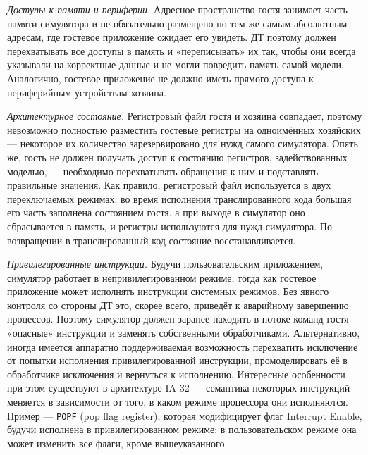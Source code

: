 \begin{itemize*}

\item \textit{Доступы к памяти и периферии.} Адресное пространство гостя занимает часть памяти симулятора и не обязательно размещено по тем же самым абсолютным адресам, где гостевое приложение ожидает его увидеть. ДТ поэтому должен перехватывать все доступы в память и «переписывать» их так, чтобы они всегда указывали на корректные данные и не могли повредить память самой модели. Аналогично, гостевое приложение не должно иметь прямого доступа к периферийным устройствам хозяина.

\item \textit{Архитектурное состояние.} Регистровый файл гостя и хозяина совпадает, поэтому невозможно полностью разместить гостевые регистры на одноимённых хозяйских --- некоторое их количество зарезервировано для нужд самого симулятора. Опять же, гость не должен получать доступ к состоянию регистров, задействованных моделью, --- необходимо перехватывать обращения к ним и подставлять правильные значения. Как правило, регистровый файл используется в двух переключаемых режимах: во время исполнения транслированного кода большая его часть заполнена состоянием гостя, а при выходе в симулятор оно сбрасывается в память, и регистры используются для нужд симулятора. По возвращении в транслированный код состояние восстанавливается. 

\item\textit{Привилегированные инструкции.} Будучи пользовательским приложением, симулятор работает в непривилегированном режиме, тогда как гостевое приложение может исполнять инструкции системных режимов. Без явного контроля со стороны ДТ это, скорее всего, приведёт к аварийному завершению процессов. Поэтому симулятор должен заранее находить в потоке команд гостя «опасные» инструкции и заменять собственными обработчиками. Альтернативно, иногда имеется аппаратно поддерживаемая возможность перехватить исключение от попытки исполнения привилегированной инструкции, промоделировать её в обработчике исключения и вернуться к исполнению. Интересные особенности при этом существуют в архитектуре IA-32 --- семантика некоторых инструкций меняется в зависимости от того, в каком режиме процессора они исполняются. Пример --- \texttt{POPF} (\abbr pop flag register), которая модифицирует флаг Interrupt Enable, будучи исполнена в привилегированном режиме; в пользовательском режиме она может изменить все флаги, кроме вышеуказанного.

\end{itemize*}

